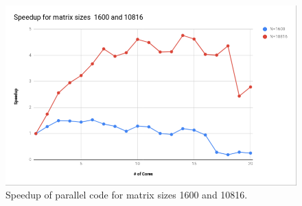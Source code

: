 \documentclass{article}
\begin{document}
\begin{spacing}{1.1}
\begin{center}
	\begin{figure}[H]
	\centering
       \includegraphics[scale=.40]{speedup.png}
        \caption{\label{Speedup} Speedup of parallel code for matrix sizes 1600 and 10816.} 
	\end{figure}
\end{center}



\end{spacing}
\end{document}
